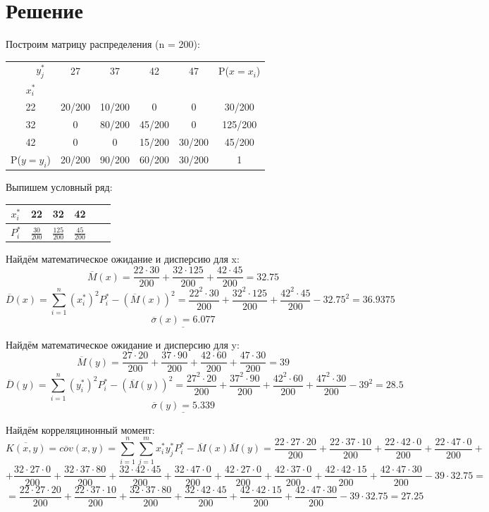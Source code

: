 \documentclass{article}
\begin{document}
\section*{Решение}
Построим матрицу распределения (n = 200):
\begin{table}[H]
    \centering
    \begin{tabular}{|c|c|c|c|c|c|}
    \hline
     \ \ \ \ $y_j^*$&  27&  37&  42& 47& P($x=x_i$)\\
    $x_i^*$&  &  &  & &\\
    \hline
    22&  20/200&  10/200&  0& 0& 30/200\\
    \hline
    32&  0&  80/200&  45/200& 0& 125/200\\
    \hline
    42&  0&  0&  15/200& 30/200& 45/200\\
    \hline
    P($y=y_i$)&  20/200&  90/200& 60/200& 30/200& 1\\
    \hline
    \end{tabular}
\end{table}
Выпишем условный ряд:
\begin{table}[H]
    \centering
    \begin{tabular}{|c|c|c|c|c|c|}
    \hline
    $x_i^*$&  22&  32& 42\\
    \hline
    $P_i^*$& $\frac{30}{200}$&  $\frac{125}{200}$& $\frac{45}{200}$\\
    \hline
    \end{tabular}
\end{table}
Найдём математическое ожидание и дисперсию для x:
\[\overline{M}(x) = \frac{22\cdot 30}{200}+ \frac{32\cdot 125}{200} + \frac{42\cdot 45}{200} = 32.75\]
\[\overline{D}(x) = \sum_{i=1}^{n}(x_i^*)^2P_i^*-(\overline{M}(x))^2 = \frac{22^2\cdot 30}{200}+ \frac{32^2\cdot 125}{200} + \frac{42^2\cdot 45}{200} - 32.75^2 = 36.9375\]
\[\underline{\overline{\sigma}(x) = 6.077}\]

Найдём математическое ожидание и дисперсию для y:
\[\overline{M}(y) = \frac{27\cdot 20}{200}+ \frac{37\cdot 90}{200} + \frac{42\cdot 60}{200} + \frac{47\cdot 30}{200} = 39\]
\[\overline{D}(y) = \sum_{i=1}^{n}(y_i^*)^2P_i^*-(\overline{M}(y))^2 = \frac{27^2\cdot 20}{200}+ \frac{37^2\cdot 90}{200} + \frac{42^2\cdot 60}{200} + \frac{47^2\cdot 30}{200} - 39^2 = 28.5\]
\[\underline{\overline{\sigma}(y) = 5.339}\]

Найдём корреляцинонный момент: 
\[\overline{K(x, y)} = \overline{cov}(x, y) = \sum_{i=1}^{n}\sum_{j=1}^{m}x_i^*y_j^*P_i^* - \overline{M}(x)\overline{M}(y) = \frac{22\cdot 27 \cdot 20}{200} + \frac{22\cdot 37 \cdot 10}{200} + \frac{22\cdot 42 \cdot 0}{200} + \frac{22\cdot 47 \cdot 0}{200} + \]
\[+ \frac{32\cdot 27 \cdot 0}{200} + \frac{32\cdot 37 \cdot 80}{200} + \frac{32\cdot 42 \cdot 45}{200} + \frac{32\cdot 47 \cdot 0}{200} + \frac{42\cdot 27 \cdot 0}{200} + \frac{42\cdot 37 \cdot 0}{200} + \frac{42\cdot 42 \cdot 15}{200} + \frac{42\cdot 47 \cdot 30}{200} - 39\cdot 32.75= \]
\[ = \frac{22\cdot 27 \cdot 20}{200} + \frac{22\cdot 37 \cdot 10}{200} + \frac{32\cdot 37 \cdot 80}{200} + \frac{32\cdot 42 \cdot 45}{200} + \frac{42\cdot 42 \cdot 15}{200} + \frac{42\cdot 47 \cdot 30}{200} - 39\cdot 32.75 = 27.25\]
\end{document}
